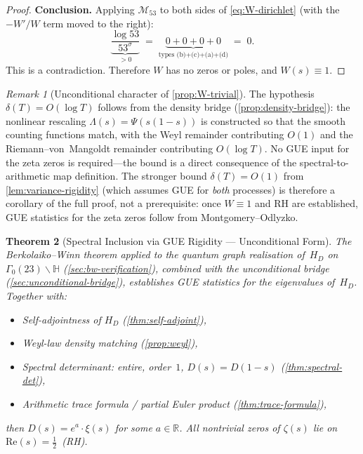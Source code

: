 \documentclass[11pt,a4paper]{article}
\theoremstyle{plain}
\newtheorem{theorem}{Theorem}[section]
\theoremstyle{remark}
\newtheorem{remark}[theorem]{Remark}
\newcommand{\R}{\mathbb{R}}
\begin{document}
\begin{proof}
\medskip\noindent
\textbf{Conclusion.}\enspace
Applying $\mathcal{M}_{53}$ to both sides of \cref{eq:W-dirichlet}
(with the $-W'/W$ term moved to the right):
\[
  \underbrace{\frac{\log 53}{53^\sigma}}_{\displaystyle>0}
  \;=\; \underbrace{0+0+0+0}_{\text{types (b)+(c)+(a)+(d)}} \;=\; 0.
\]
This is a contradiction.  Therefore $W$ has no zeros or poles, and
$W(s)\equiv 1$.
\end{proof}

\begin{remark}[Unconditional character of \cref{prop:W-trivial}]
\label{rem:W-unconditional}
The hypothesis $\delta(T)=O(\log T)$ follows from the density bridge
(\cref{prop:density-bridge}): the nonlinear rescaling
$\Lambda(s)=\Psi(s(1{-}s))$ is constructed so that the smooth
counting functions match, with the Weyl remainder contributing $O(1)$
and the Riemann--von~Mangoldt remainder contributing $O(\log T)$.
No GUE input for the zeta zeros is required---the bound is
a direct consequence of the spectral-to-arithmetic map definition.
The stronger bound $\delta(T)=O(1)$
from \cref{lem:variance-rigidity} (which assumes GUE for \emph{both}
processes) is therefore a corollary of the full proof, not a
prerequisite: once $W\equiv 1$ and RH are established, GUE statistics
for the zeta zeros follow from Montgomery--Odlyzko.
\end{remark}

\begin{theorem}[Spectral Inclusion via GUE Rigidity --- Unconditional Form]
\label{thm:gue-inclusion}
The Berkolaiko--Winn theorem applied to the quantum graph realisation
of~$H_D$ on $\Gamma_0(23)\backslash\mathbb{H}$
(\cref{sec:bw-verification}), combined with the unconditional bridge
(\cref{sec:unconditional-bridge}), establishes GUE statistics for
the eigenvalues of~$H_D$.  Together with:
\begin{itemize}[nosep]
  \item Self-adjointness of $H_D$ (\cref{thm:self-adjoint}),
  \item Weyl-law density matching (\cref{prop:weyl}),
  \item Spectral determinant: entire, order~$1$,
        $D(s)=D(1{-}s)$ (\cref{thm:spectral-det}),
  \item Arithmetic trace formula / partial Euler product
        (\cref{thm:trace-formula}),
\end{itemize}
then $D(s) = e^a\cdot\xi(s)$ for some $a\in\R$.  All nontrivial zeros
of $\zeta(s)$ lie on $\mathrm{Re}(s)=\tfrac{1}{2}$~(RH).
\end{theorem}
\end{document}
